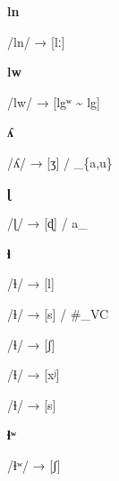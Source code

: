 \begin{center}\textbf{ln}\end{center}
\begin{multicols}{4}
\noindent /ln/ → [lː]
\end{multicols}


\begin{center}\textbf{lw}\end{center}
\begin{multicols}{4}
\noindent /lw/ → [lgʷ \textasciitilde{} lg]
\end{multicols}


\begin{center}\textbf{ʎ}\end{center}
\begin{multicols}{4}
\noindent /ʎ/ → [ʒ] / \_\{a,u\}
\end{multicols}


\begin{center}\textbf{ɭ}\end{center}
\begin{multicols}{4}
\noindent /ɭ/ → [ɖ] / a\_
\end{multicols}


\begin{center}\textbf{ɬ}\end{center}
\begin{multicols}{4}
\noindent /ɬ/ → [l]

\noindent /ɬ/ → [s] / \#\_VC

\noindent /ɬ/ → [ʃ]

\noindent /ɬ/ → [xʲ]

\noindent /ɬ/ → [s]
\end{multicols}


\begin{center}\textbf{ɬʷ}\end{center}
\begin{multicols}{4}
\noindent /ɬʷ/ → [ʃ]
\end{multicols}


